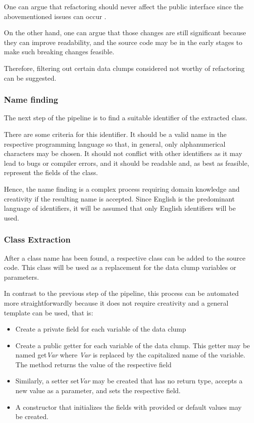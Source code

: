 One can argue that refactoring should never affect the public interface since the abovementioned issues can occur \cite{10.1145/1352678.1352681}.

On the other hand, one can argue that those changes are still significant because they can improve readability, and the source code may be in the early stages to make such breaking changes feasible. 

Therefore, filtering out certain data clumps considered not worthy of refactoring can be suggested.

\subsubsection{Name finding}\label{subsec:chap3_data_clump_name_finding}
The next step of the pipeline is to find a suitable identifier of the extracted class.

There are some criteria for this identifier. It should be a valid name in the respective programming language so that, in general, only alphanumerical characters may be chosen. It should not conflict with other identifiers as it may lead to bugs or compiler errors, and it should be readable and, as best as feasible, represent the fields of the class.

Hence, the name finding is a complex process requiring domain knowledge and creativity if the resulting name is accepted. 
Since English is the predominant language of identifiers, it will be assumed that only English identifiers will be used. 


\subsubsection{Class Extraction}\label{subsec:chap3_data_class_extraction}
After a class name has been found, a respective class can be added to the source code. This class will be used as a replacement for the data clump variables or parameters. 

In contrast to the previous step of the pipeline, this process can be automated more straightforwardly because it does not require creativity and a general template can be used, that is:
\begin{itemize}
    \item Create a private field for each variable of the data clump
    \item Create a public getter for each variable of the data clump. This getter may be named get\textit{Var} where \textit{Var} is replaced by the capitalized name of the variable. The method returns the value of the respective field
    \item Similarly, a setter set\textit{Var} may be created that has no return type, accepts a new value as a parameter, and sets the respective field. 
    \item A constructor that initializes the fields with provided or default values may be created. 
\end{itemize}

